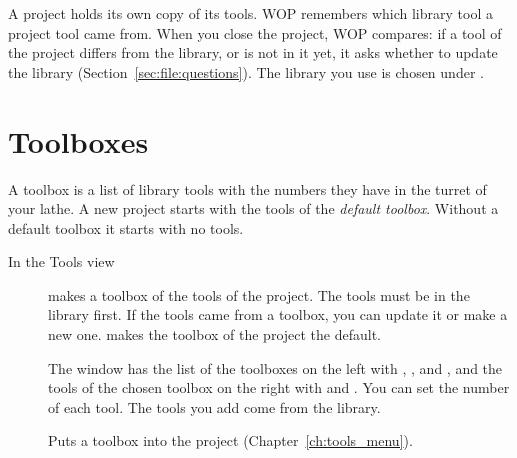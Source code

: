 A project holds its own copy of its tools. WOP remembers which library tool a project tool came from. When you close the project, WOP compares: if a tool of the project differs from the library, or is not in it yet, it asks whether to update the library (Section~\ref{sec:file:questions}). The library you use is chosen under .

\section{Toolboxes}\label{sec:tools:toolboxes}
A toolbox is a list of library tools with the numbers they have in the turret of your lathe. A new project starts with the tools of the \emph{default toolbox}. Without a default toolbox it starts with no tools.

\begin{description}
\item[In the Tools view]  makes a toolbox of the tools of the project. The tools must be in the library first. If the tools came from a toolbox, you can update it or make a new one.  makes the toolbox of the project the default.
\item[] The window has the list of the toolboxes on the left with , ,  and , and the tools of the chosen toolbox on the right with  and . You can set the number of each tool. The tools you add come from the library.
\item[] Puts a toolbox into the project (Chapter~\ref{ch:tools_menu}).
\end{description}
